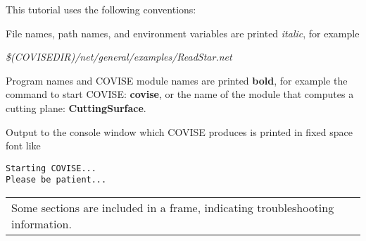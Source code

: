 \vspace{0.5cm}
This tutorial uses the following conventions: 

File names, path names, and environment variables are printed {\it italic}, for example 

{\it \$(COVISEDIR)/net/general/examples/ReadStar.net}

Program names and COVISE module names are printed {\bf bold}, for example the 
command to start COVISE: {\bf covise}, or the name of the module that
computes a cutting plane: {\bf CuttingSurface}. 

Output to the console window which COVISE produces is printed in fixed space font like 
\begin{verbatim}
Starting COVISE...
Please be patient... 
\end{verbatim}

\begin{longtable}{|l|}
\hline
Some sections are included in a frame, indicating troubleshooting information.\endhead
\hline
\end{longtable}
